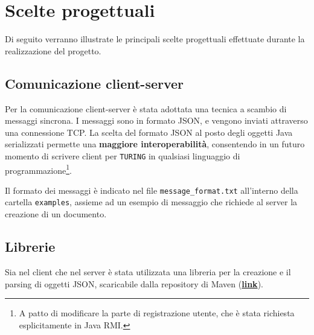 \section{Scelte progettuali}
Di seguito verranno illustrate le principali scelte progettuali effettuate durante la realizzazione del progetto.





\subsection{Comunicazione client-server}
Per la comunicazione client-server è stata adottata una tecnica a scambio di messaggi sincrona. I messaggi sono in formato JSON, e vengono inviati attraverso una connessione TCP. La scelta del formato JSON al posto degli oggetti Java serializzati permette una \textbf{maggiore interoperabilità}, consentendo in un futuro momento di scrivere client per \texttt{TURING} in qualsiasi linguaggio di programmazione\footnote{A patto di modificare la parte di registrazione utente, che è stata richiesta esplicitamente in Java RMI.}.

\medskip

Il formato dei messaggi è indicato nel file \texttt{message\_format.txt} all'interno della cartella \texttt{examples}, assieme ad un esempio di messaggio che richiede al server la creazione di un documento.

\subsection{Librerie}
Sia nel client che nel server è stata utilizzata una libreria per la creazione e il parsing di oggetti JSON, scaricabile dalla repository di Maven (\href{https://mvnrepository.com/artifact/org.json/json}{\textbf{link}}).
